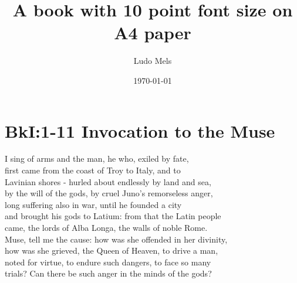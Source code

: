 \documentclass[10pt, a4paper, titlepage]{book}
\title{A book with 10 point font size on A4 paper}
\author{Ludo Mels}
\date{\today}
\begin{document}
\maketitle
\newpage
\section*{BkI:1-11 Invocation to the Muse}
I sing of arms and the man, he who, exiled by fate,\\
first came from the coast of Troy to Italy, and to\\
Lavinian shores - hurled about endlessly by land and sea,\\
by the will of the gods, by cruel Juno's remorseless anger,\\
long suffering also in war, until he founded a city\\
and brought his gods to Latium: from that the Latin people\\
came, the lords of Alba Longa, the walls of noble Rome.\\
Muse, tell me the cause: how was she offended in her divinity,\\
how was she grieved, the Queen of Heaven, to drive a man,\\
noted for virtue, to endure such dangers, to face so many\\
trials? Can there be such anger in the minds of the gods?

\end{document}
